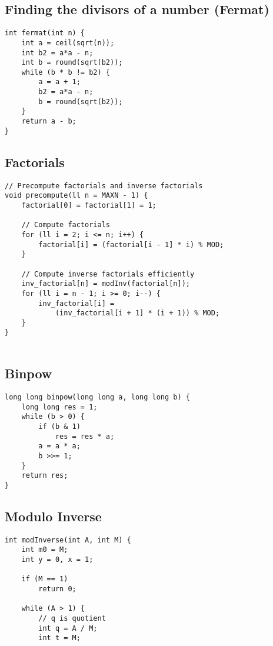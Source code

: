 \documentclass[10pt]{article}
\begin{document}
\begin{multicols*}{2}
\subsection{Finding the divisors of a number (Fermat)}
\begin{lstlisting}[style=compactcpp]
int fermat(int n) {
    int a = ceil(sqrt(n));
    int b2 = a*a - n;
    int b = round(sqrt(b2));
    while (b * b != b2) {
        a = a + 1;
        b2 = a*a - n;
        b = round(sqrt(b2));
    }
    return a - b;
}
\end{lstlisting}


\subsection{Factorials}

\begin{lstlisting}[style=compactcpp]
// Precompute factorials and inverse factorials
void precompute(ll n = MAXN - 1) {
    factorial[0] = factorial[1] = 1;
    
    // Compute factorials
    for (ll i = 2; i <= n; i++) {
        factorial[i] = (factorial[i - 1] * i) % MOD;
    }
    
    // Compute inverse factorials efficiently
    inv_factorial[n] = modInv(factorial[n]);
    for (ll i = n - 1; i >= 0; i--) {
        inv_factorial[i] = 
            (inv_factorial[i + 1] * (i + 1)) % MOD;
    }
}
 
\end{lstlisting}

\subsection{Binpow}
\begin{lstlisting}[style=compactcpp]
long long binpow(long long a, long long b) {
    long long res = 1;
    while (b > 0) {
        if (b & 1)
            res = res * a;
        a = a * a;
        b >>= 1;
    }
    return res;
}
\end{lstlisting}
\subsection{Modulo Inverse}
\begin{lstlisting}[style=compactcpp]
int modInverse(int A, int M) {
    int m0 = M;
    int y = 0, x = 1;

    if (M == 1)
        return 0;

    while (A > 1) {
        // q is quotient
        int q = A / M;
        int t = M;


\end{lstlisting}
\end{multicols*}
\end{document}
